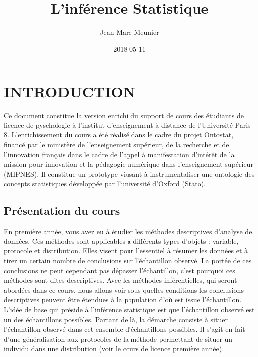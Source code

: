 \documentclass[]{book}
\title{L'inférence Statistique}
\author{Jean-Marc Meunier}
\date{2018-05-11}
\theoremstyle{definition}
\theoremstyle{definition}
\theoremstyle{definition}
\theoremstyle{remark}
\begin{document}
\maketitle

{
\setcounter{tocdepth}{1}
\tableofcontents
}
\hypertarget{introduction}{%
\chapter*{INTRODUCTION}\label{introduction}}

Ce document constitue la version enrichi du support de cours des
étudiants de licence de pyschologie à l'institut d'enseignement à
distance de l'Université Paris 8. L'enrichissement du cours a été
réalisé dans le cadre du projet Ontostat, financé par le ministère de
l'enseignement supérieur, de la recherche et de l'innovation français
dans le cadre de l'appel à manifestation d'intérêt de la mission pour
innovation et la pédagogie numérique dans l'enseignement supérieur
(MIPNES). Il constitue un prototype viusant à instrumentaliser une
ontologie des concepts statistiques développée par l'université d'Oxford
(Stato).

\hypertarget{presentation-du-cours}{%
\section*{Présentation du cours}\label{presentation-du-cours}}

En première année, vous avez eu à étudier les méthodes descriptives
d'analyse de données. Ces méthodes sont applicables à différents types
d'objets : variable, protocole et distribution. Elles visent pour
l'essentiel à résumer les données et à tirer un certain nombre de
conclusions sur l'échantillon observé. La portée de ces conclusions ne
peut cependant pas dépasser l'échantillon, c'est pourquoi ces méthodes
sont dites descriptives. Avec les méthodes inférentielles, qui seront
abordées dans ce cours, nous allons voir sous quelles conditions les
conclusions descriptives peuvent être étendues à la population d'où est
issue l'échantillon. L'idée de base qui préside à l'inférence
statistique est que l'échantillon observé est un des échantillons
possibles. Partant de là, la démarche consiste à situer l'échantillon
observé dans cet ensemble d'échantillons possibles. Il s'agit en fait
d'une généralisation aux protocoles de la méthode permettant de situer
un individu dans une distribution (voir le cours de licence première
année)
\end{document}
